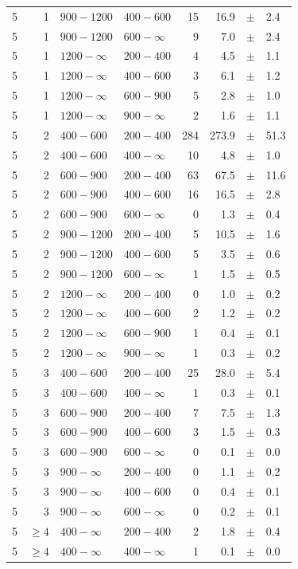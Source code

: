 \begin{table}[!h]
\begin{tabular}{rrllrrcl}
5 & 1 & $ 900-1200$ & $400-600$ &     15 &     16.9 &$\pm$&    2.4 \\
5 & 1 & $ 900-1200$ & $600-\infty$ &      9 &      7.0 &$\pm$&    2.4 \\
5\T & 1 & $1200- \infty$ & $200-400$ &      4 &      4.5 &$\pm$&    1.1 \\
5 & 1 & $1200- \infty$ & $400-600$ &      3 &      6.1 &$\pm$&    1.2 \\
5 & 1 & $1200- \infty$ & $600-900$ &      5 &      2.8 &$\pm$&    1.0 \\
5 & 1 & $1200- \infty$ & $900-\infty$ &      2 &      1.6 &$\pm$&    1.1 \\
5\T & 2 & $ 400- 600$ & $200-400$ &    284 &    273.9 &$\pm$&   51.3 \\
5 & 2 & $ 400- 600$ & $400-\infty$ &     10 &      4.8 &$\pm$&    1.0 \\
5\T & 2 & $ 600- 900$ & $200-400$ &     63 &     67.5 &$\pm$&   11.6 \\
5 & 2 & $ 600- 900$ & $400-600$ &     16 &     16.5 &$\pm$&    2.8 \\
5 & 2 & $ 600- 900$ & $600-\infty$ &      0 &      1.3 &$\pm$&    0.4 \\
5\T & 2 & $ 900-1200$ & $200-400$ &      5 &     10.5 &$\pm$&    1.6 \\
5 & 2 & $ 900-1200$ & $400-600$ &      5 &      3.5 &$\pm$&    0.6 \\
5 & 2 & $ 900-1200$ & $600-\infty$ &      1 &      1.5 &$\pm$&    0.5 \\
5\T & 2 & $1200- \infty$ & $200-400$ &      0 &      1.0 &$\pm$&    0.2 \\
5 & 2 & $1200- \infty$ & $400-600$ &      2 &      1.2 &$\pm$&    0.2 \\
5 & 2 & $1200- \infty$ & $600-900$ &      1 &      0.4 &$\pm$&    0.1 \\
5 & 2 & $1200- \infty$ & $900-\infty$ &      1 &      0.3 &$\pm$&    0.2 \\
5\T & 3 & $ 400- 600$ & $200-400$ &     25 &     28.0 &$\pm$&    5.4 \\
5 & 3 & $ 400- 600$ & $400-\infty$ &      1 &      0.3 &$\pm$&    0.1 \\
5\T & 3 & $ 600- 900$ & $200-400$ &      7 &      7.5 &$\pm$&    1.3 \\
5 & 3 & $ 600- 900$ & $400-600$ &      3 &      1.5 &$\pm$&    0.3 \\
5 & 3 & $ 600- 900$ & $600-\infty$ &      0 &      0.1 &$\pm$&    0.0 \\
5\T & 3 & $ 900- \infty$ & $200-400$ &      0 &      1.1 &$\pm$&    0.2 \\
5 & 3 & $ 900- \infty$ & $400-600$ &      0 &      0.4 &$\pm$&    0.1 \\
5 & 3 & $ 900- \infty$ & $600-\infty$ &      0 &      0.2 &$\pm$&    0.1 \\
5\T & $\geq 4$ & $ 400- \infty$ & $200-400$ &      2 &      1.8 &$\pm$&    0.4 \\
5 & $\geq 4$ & $ 400- \infty$ & $400-\infty$ &      1 &      0.1 &$\pm$&    0.0 \\
    \hline
  \end{tabular}
\end{table}

